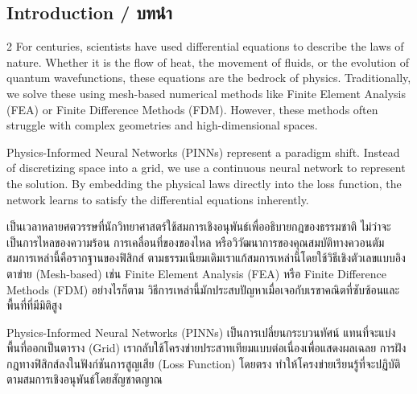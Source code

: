 \subsection{Introduction \quad / \quad \textthai{บทนำ}}
\begin{paracol}{2}
For centuries, scientists have used differential equations to describe the laws of nature. Whether it is the flow of heat, the movement of fluids, or the evolution of quantum wavefunctions, these equations are the bedrock of physics. Traditionally, we solve these using mesh-based numerical methods like Finite Element Analysis (FEA) or Finite Difference Methods (FDM). However, these methods often struggle with complex geometries and high-dimensional spaces.

Physics-Informed Neural Networks (PINNs) represent a paradigm shift. Instead of discretizing space into a grid, we use a continuous neural network to represent the solution. By embedding the physical laws directly into the loss function, the network learns to satisfy the differential equations inherently.

\switchcolumn

\begin{thai}
เป็นเวลาหลายศตวรรษที่นักวิทยาศาสตร์ใช้สมการเชิงอนุพันธ์เพื่ออธิบายกฎของธรรมชาติ ไม่ว่าจะเป็นการไหลของความร้อน การเคลื่อนที่ของของไหล หรือวิวัฒนาการของคุณสมบัติทางควอนตัม สมการเหล่านี้คือรากฐานของฟิสิกส์ ตามธรรมเนียมเดิมเราแก้สมการเหล่านี้โดยใช้วิธีเชิงตัวเลขแบบอิงตาข่าย (Mesh-based) เช่น Finite Element Analysis (FEA) หรือ Finite Difference Methods (FDM) อย่างไรก็ตาม วิธีการเหล่านี้มักประสบปัญหาเมื่อเจอกับเรขาคณิตที่ซับซ้อนและพื้นที่ที่มีมิติสูง

Physics-Informed Neural Networks (PINNs) เป็นการเปลี่ยนกระบวนทัศน์ แทนที่จะแบ่งพื้นที่ออกเป็นตาราง (Grid) เรากลับใช้โครงข่ายประสาทเทียมแบบต่อเนื่องเพื่อแสดงผลเฉลย การฝังกฎทางฟิสิกส์ลงในฟังก์ชันการสูญเสีย (Loss Function) โดยตรง ทำให้โครงข่ายเรียนรู้ที่จะปฏิบัติตามสมการเชิงอนุพันธ์โดยสัญชาตญาณ
\end{thai}
\end{paracol}
